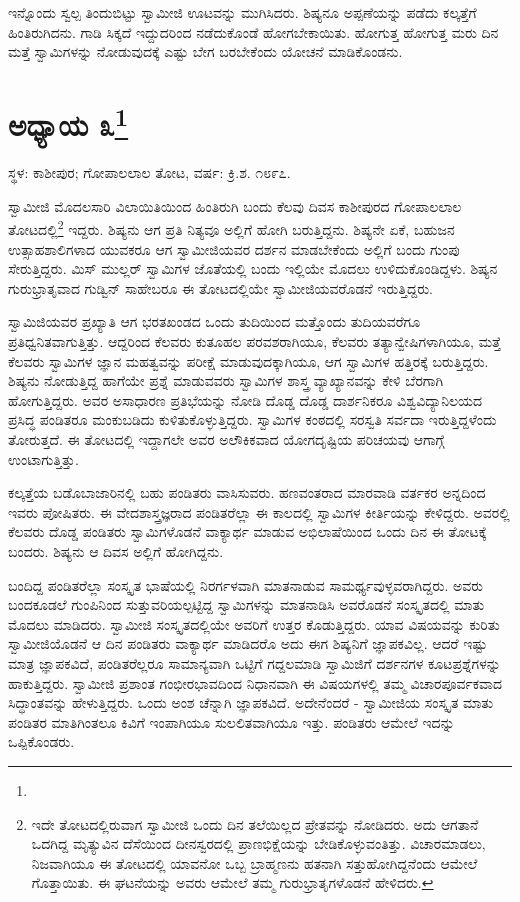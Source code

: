 ಇನ್ನೊಂದು ಸ್ವಲ್ಪ ತಿಂದುಬಿಟ್ಟು ಸ್ವಾಮೀಜಿ ಊಟವನ್ನು ಮುಗಿಸಿದರು. ಶಿಷ್ಯನೂ ಅಪ್ಪಣೆಯನ್ನು ಪಡೆದು ಕಲ್ಕತ್ತೆಗೆ ಹಿಂತಿರುಗಿದನು. ಗಾಡಿ ಸಿಕ್ಕದೆ ಇದ್ದುದರಿಂದ ನಡೆದುಕೊಂಡೆ ಹೋಗಬೇಕಾಯಿತು. ಹೋಗುತ್ತ ಹೋಗುತ್ತ ಮರು ದಿನ ಮತ್ತೆ ಸ್ವಾಮಿಗಳನ್ನು ನೋಡುವುದಕ್ಕೆ ಎಷ್ಟು ಬೇಗ ಬರಬೇಕೆಂದು ಯೋಚನೆ ಮಾಡಿಕೊಂಡನು.

\newpage

\chapter[ಅಧ್ಯಾಯ ೩]{ಅಧ್ಯಾಯ ೩\protect\footnote{}}

\begin{center}
ಸ್ಥಳ: ಕಾಶೀಪುರ; ಗೋಪಾಲಲಾಲ ತೋಟ, ವರ್ಷ: ಕ್ರಿ.ಶ. ೧೮೯೭.
\end{center}

ಸ್ವಾಮೀಜಿ ಮೊದಲಸಾರಿ ವಿಲಾಯಿತಿಯಿಂದ ಹಿಂತಿರುಗಿ ಬಂದು ಕೆಲವು ದಿವಸ ಕಾಶೀಪುರದ ಗೋಪಾಲಲಾಲ ತೋಟದಲ್ಲಿ\footnote{ಇದೇ ತೋಟದಲ್ಲಿರುವಾಗ ಸ್ವಾಮೀಜಿ ಒಂದು ದಿನ ತಲೆಯಿಲ್ಲದ ಪ್ರೇತವನ್ನು ನೋಡಿದರು. ಅದು ಆಗತಾನೆ ಒದಗಿದ್ದ ಮೃತ್ಯುವಿನ ದೆಸೆಯಿಂದ ದೀನಸ್ವರದಲ್ಲಿ ಪ್ರಾಣಭಿಕ್ಷೆಯನ್ನು ಬೇಡಿಕೊಳ್ಳುವಂತಿತ್ತು. ವಿಚಾರಮಾಡಲು, ನಿಜವಾಗಿಯೂ ಈ ತೋಟದಲ್ಲಿ ಯಾವನೋ ಒಬ್ಬ ಬ್ರಾಹ್ಮಣನು ಹತನಾಗಿ ಸತ್ತುಹೋಗಿದ್ದನೆಂದು ಆಮೇಲೆ ಗೊತ್ತಾಯಿತು. ಈ ಘಟನೆಯನ್ನು ಅವರು ಆಮೇಲೆ ತಮ್ಮ ಗುರುಭ್ರಾತೃಗಳೊಡನೆ ಹೇಳಿದರು.} ಇದ್ದರು. ಶಿಷ್ಯನು ಆಗ ಪ್ರತಿ ನಿತ್ಯವೂ ಅಲ್ಲಿಗೆ ಹೋಗಿ ಬರುತ್ತಿದ್ದನು. ಶಿಷ್ಯನೇ ಏಕೆ, ಬಹುಜನ ಉತ್ಸಾಹಶಾಲಿಗಳಾದ ಯುವಕರೂ ಆಗ ಸ್ವಾಮೀಜಿಯವರ ದರ್ಶನ ಮಾಡಬೇಕೆಂದು ಅಲ್ಲಿಗೆ ಬಂದು ಗುಂಪು ಸೇರುತ್ತಿದ್ದರು. ಮಿಸ್ ಮುಲ್ಲರ್ ಸ್ವಾಮಿಗಳ ಜೊತೆಯಲ್ಲಿ ಬಂದು ಇಲ್ಲಿಯೇ ಮೊದಲು ಉಳಿದುಕೊಂಡಿದ್ದಳು. ಶಿಷ್ಯನ ಗುರುಭ್ರಾತೃವಾದ ಗುಡ್ವಿನ್ ಸಾಹೇಬರೂ ಈ ತೋಟದಲ್ಲಿಯೇ ಸ್ವಾಮೀಜಿಯವರೊಡನೆ ಇರುತ್ತಿದ್ದರು.

ಸ್ವಾಮಿಜಿಯವರ ಪ್ರಖ್ಯಾತಿ ಆಗ ಭರತಖಂಡದ ಒಂದು ತುದಿಯಿಂದ ಮತ್ತೊಂದು ತುದಿಯವರೆಗೂ ಪ್ರತಿಧ್ವನಿತವಾಗುತ್ತಿತ್ತು. ಆದ್ದರಿಂದ ಕೆಲವರು ಕುತೂಹಲ ಪರವಶರಾಗಿಯೂ, ಕೆಲವರು ತತ್ಯಾನ್ವೇಷಿಗಳಾಗಿಯೂ, ಮತ್ತೆ ಕೆಲವರು ಸ್ವಾಮಿಗಳ ಜ್ಞಾನ ಮಹತ್ವವನ್ನು ಪರೀಕ್ಷೆ ಮಾಡುವುದಕ್ಕಾಗಿಯೂ, ಆಗ ಸ್ವಾಮಿಗಳ ಹತ್ತಿರಕ್ಕೆ ಬರುತ್ತಿದ್ದರು. ಶಿಷ್ಯನು ನೋಡುತ್ತಿದ್ದ ಹಾಗೆಯೇ ಪ್ರಶ್ನೆ ಮಾಡುವವರು ಸ್ವಾಮಿಗಳ ಶಾಸ್ತ್ರ ವ್ಯಾಖ್ಯಾನವನ್ನು ಕೇಳಿ ಬೆರಗಾಗಿ ಹೋಗುತ್ತಿದ್ದರು. ಅವರ ಅಸಾಧಾರಣ ಪ್ರತಿಭೆಯನ್ನು ನೋಡಿ ದೊಡ್ಡ ದೊಡ್ಡ ದಾರ್ಶನಿಕರೂ ವಿಶ್ವವಿದ್ಯಾನಿಲಯದ ಪ್ರಸಿದ್ಧ ಪಂಡಿತರೂ ಮಂಕುಬಡಿದು ಕುಳಿತುಕೊಳ್ಳುತ್ತಿದ್ದರು. ಸ್ವಾಮಿಗಳ ಕಂಠದಲ್ಲಿ ಸರಸ್ವತಿ ಸರ್ವದಾ ಇರುತ್ತಿದ್ದಳೆಂದು ತೋರುತ್ತದೆ. ಈ ತೋಟದಲ್ಲಿ ಇದ್ದಾಗಲೇ ಅವರ ಅಲೌಕಿಕವಾದ ಯೋಗದೃಷ್ಟಿಯ ಪರಿಚಯವು ಆಗಾಗ್ಗೆ ಉಂಟಾಗುತ್ತಿತ್ತು.

ಕಲ್ಕತ್ತೆಯ ಬಡೊಬಾಜಾರಿನಲ್ಲಿ ಬಹು ಪಂಡಿತರು ವಾಸಿಸುವರು. ಹಣವಂತರಾದ ಮಾರವಾಡಿ ವರ್ತಕರ ಅನ್ನದಿಂದ ಇವರು ಪೋಷಿತರು. ಈ ವೇದಶಾಸ್ತ್ರಜ್ಞರಾದ ಪಂಡಿತರೆಲ್ಲಾ ಈ ಕಾಲದಲ್ಲಿ ಸ್ವಾಮಿಗಳ ಕೀರ್ತಿಯನ್ನು ಕೇಳಿದ್ದರು. ಅವರಲ್ಲಿ ಕೆಲವರು ದೊಡ್ಡ ಪಂಡಿತರು ಸ್ವಾಮಿಗಳೊಡನೆ ವಾಕ್ಯಾರ್ಥ ಮಾಡುವ ಅಭಿಲಾಷೆಯಿಂದ ಒಂದು ದಿನ ಈ ತೋಟಕ್ಕೆ ಬಂದರು. ಶಿಷ್ಯನು ಆ ದಿವಸ ಅಲ್ಲಿಗೆ ಹೋಗಿದ್ದನು.

ಬಂದಿದ್ದ ಪಂಡಿತರೆಲ್ಲಾ ಸಂಸ್ಕೃತ ಭಾಷೆಯಲ್ಲಿ ನಿರರ್ಗಳವಾಗಿ ಮಾತನಾಡುವ ಸಾಮರ್ಥ್ಯವುಳ್ಳವರಾಗಿದ್ದರು. ಅವರು ಬಂದಕೂಡಲೆ ಗುಂಪಿನಿಂದ ಸುತ್ತುವರಿಯಲ್ಪಟ್ಟಿದ್ದ ಸ್ವಾಮಿಗಳನ್ನು ಮಾತನಾಡಿಸಿ ಅವರೊಡನೆ ಸಂಸ್ಕೃತದಲ್ಲಿ ಮಾತು ಮೊದಲು ಮಾಡಿದರು. ಸ್ವಾಮೀಜಿ ಸಂಸ್ಕೃತದಲ್ಲಿಯೇ ಅವರಿಗೆ ಉತ್ತರ ಕೊಡುತ್ತಿದ್ದರು. ಯಾವ ವಿಷಯವನ್ನು ಕುರಿತು ಸ್ವಾಮೀಜಿಯೊಡನೆ ಆ ದಿನ ಪಂಡಿತರು ವಾಕ್ಯಾರ್ಥ ಮಾಡಿದರೊ ಅದು ಈಗ ಶಿಷ್ಯನಿಗೆ ಜ್ಞಾಪಕವಿಲ್ಲ. ಆದರೆ ಇಷ್ಟು ಮಾತ್ರ ಜ್ಞಾಪಕವಿದೆ, ಪಂಡಿತರೆಲ್ಲರೂ ಸಾಮಾನ್ಯವಾಗಿ ಒಟ್ಟಿಗೆ ಗದ್ದಲಮಾಡಿ ಸ್ವಾಮಿಜಿಗೆ ದರ್ಶನಗಳ ಕೂಟಪ್ರಶ್ನೆಗಳನ್ನು ಹಾಕುತ್ತಿದ್ದರು. ಸ್ವಾಮೀಜಿ ಪ್ರಶಾಂತ ಗಂಭೀರಭಾವದಿಂದ ನಿಧಾನವಾಗಿ ಈ ವಿಷಯಗಳಲ್ಲಿ ತಮ್ಮ ವಿಚಾರಪೂರ್ವಕವಾದ ಸಿದ್ಧಾಂತವನ್ನು ಹೇಳುತ್ತಿದ್ದರು. ಒಂದು ಅಂಶ ಚೆನ್ನಾಗಿ ಜ್ಞಾಪಕವಿದೆ. ಅದೇನೆಂದರೆ - ಸ್ವಾಮೀಜಿಯ ಸಂಸ್ಕೃತ ಮಾತು ಪಂಡಿತರ ಮಾತಿಗಿಂತಲೂ ಕಿವಿಗೆ ಇಂಪಾಗಿಯೂ ಸುಲಲಿತವಾಗಿಯೂ ಇತ್ತು. ಪಂಡಿತರು ಆಮೇಲೆ ಇದನ್ನು ಒಪ್ಪಿಕೊಂಡರು.

